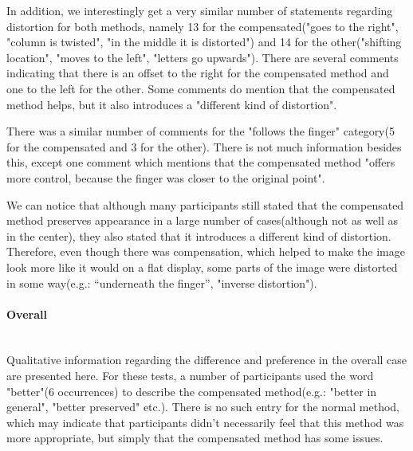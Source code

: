 \documentclass[]{article}
\begin{document}
In addition, we interestingly get a very similar number of statements regarding distortion for both methods, namely 13 for the compensated("goes to the right", "column is twisted", "in the middle it is distorted") and 14 for the other("shifting location", "moves to the left", "letters go upwards"). There are several comments indicating that there is an offset to the right for the compensated method and one to the left for the other. Some comments do mention that the compensated method  helps, but it also introduces a "different kind of distortion".

There was a similar number of comments for the "follows the finger" category(5 for the compensated and 3 for the other). There is not much information besides this, except one comment which mentions that the compensated method "offers more control, because the finger was closer to the original point".

We can notice that although many participants still stated that the compensated method preserves appearance in a large number of cases(although not as well as in the center), they also stated that it introduces a different kind of distortion. Therefore, even though there was compensation, which helped to make the image look more like it would on a flat display, some parts of the image were distorted in some way(e.g.: “underneath the finger”, "inverse distortion"). 

\paragraph{Overall}\mbox{}\\

Qualitative information regarding the difference and preference in the overall case are presented here. For these tests, a number of participants used the word "better"(6 occurrences) to describe the compensated method(e.g.: "better in general", "better preserved" etc.). There is no such entry for the normal method, which may indicate that participants didn't necessarily feel that this method was more appropriate, but simply that the compensated method has some issues.
\end{document}
